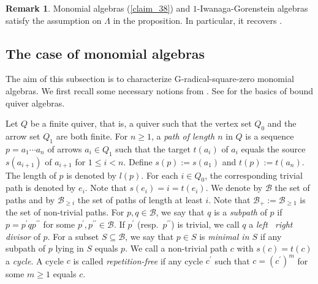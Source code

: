 \documentclass[12pt]{amsart}
\numberwithin{equation}{subsection}
\theoremstyle{plain}
\theoremstyle{definition}
\newtheorem{remark}[theorem]{Remark}
\renewcommand{\L}{\Lambda}
\newcommand{\B}{\mathcal{B}}
\begin{document}
\begin{remark}
Monomial algebras (\cref{claim_38}) and $1$-Iwanaga-Gorenstein algebras satisfy the assumption on $\L$ in the proposition.    
In particular, it recovers \cite[Proposition 3.13]{Hafezi-Bahlekeh_2024}.
\end{remark}








\subsection{The case of monomial algebras} 
\label{The_case_of_monomial_algebras}




The aim of this subsection is to characterize  G-radical-square-zero monomial algebras.
We first recall some necessary notions from \cite{Chen-Shen-Zhou_2018, Honma-Usui_2025}.
See \cite{ASS06,ARS_1995} for the basics of bound quiver algebras.





Let $Q$ be a finite quiver, that is, a quiver such that the vertex set $Q_0$ and the arrow set $Q_1$ are both finite.
For $n\geq1$, a {\it path of length $n$} in $Q$ is a sequence $p=a_1\cdots a_n$ of arrows $a_i \in Q_1$ such that the target $t(a_i)$ of $a_i$ equals the source $s(a_{i+1})$ of $a_{i+1}$ for $1\leq i< n$.
Define $s(p):=s(a_1)$ and $t(p):=t(a_n)$.
The length of $p$ is denoted by $l(p)$.
For each $i\in Q_0$, the corresponding trivial path is denoted by $e_i$. 
Note that $s(e_i)=i=t(e_i)$. 
We denote by $\B$ the set of paths
and by $\B_{\geq i}$ the set of paths of length at least $i$. 
Note that $\B_{+} := \B_{\geq 1}$ is the set of non-trivial paths.
For $p, q \in \B$, we say that $q$ is a {\it subpath} of $p$ if $p = p^{\prime} q p^{\prime\prime}$ for some $p^{\prime}, p^{\prime\prime} \in \B$.
If $p^{\prime}$ (resp.~$p^{\prime\prime}$) is trivial, we call $q$ a {\it left ~right\text{\rm )} divisor} of $p$. 
For a subset $S\subseteq\B$, we say that $p\in S$ is {\it minimal in $S$} if any subpath of $p$ lying in $S$ equals $p$.
We call a non-trivial path $c$ with $s(c) = t(c)$ a {\it cycle}.
A cycle $c$ is called {\it repetition-free} if any cycle $c^\prime$ such that $c= (c^\prime)^m$ for some $m \geq 1$ equals $c$. 
\end{document}
